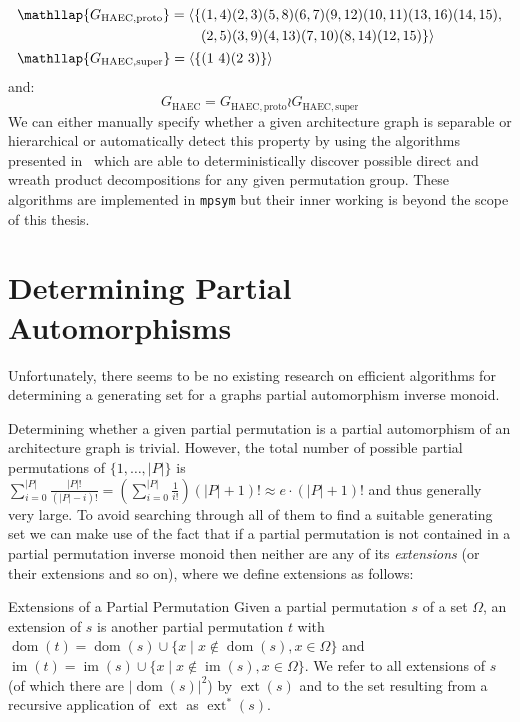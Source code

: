 \begin{align*}
  &\begin{aligned}
    \mathllap{G_{\mathrm{HAEC,proto}}} =
      \langle\{&(1, 4)(2, 3)(5, 8)(6, 7)(9, 12)(10, 11)(13, 16)(14, 15), \\
               &(2, 5)(3, 9)(4, 13)(7, 10)(8, 14)(12, 15)\}\rangle
    \end{aligned} \\
  &\mathllap{G_{\mathrm{HAEC,super}}} = \left<\{(1\ 4)(2\ 3)\}\right> \\
\end{align*}
%
and:
%
\begin{equation*}
  G_{\mathrm{HAEC}} = G_{\mathrm{HAEC,proto}} \wr G_{\mathrm{HAEC,super}}
\end{equation*}
%
We can either manually specify whether a given architecture graph is separable
or hierarchical or automatically detect this property by using the algorithms
presented in~\cite{Donaldson} which are able to deterministically discover
possible direct and wreath product decompositions for any given permutation
group. These algorithms are implemented in \texttt{mpsym} but their inner
working is beyond the scope of this thesis.

\section{Determining Partial Automorphisms}
\label{sec:ag_determining_partial_automorphisms}

Unfortunately, there seems to be no existing research on efficient algorithms
for determining a generating set for a graphs partial automorphism inverse
monoid.

Determining whether a given partial permutation is a partial automorphism of an
architecture graph is trivial. However, the total number of possible partial
permutations of $\{1, \dots, |P|\}$ is $\sum_{i=0}^{|P|} \frac{|P|!}{(|P| -
i)!} = \left(\sum_{i=0}^{|P|} \frac{1}{i!}\right) (|P| + 1)! \approx e \cdot
(|P| + 1)!$ and thus generally very large. To avoid searching through all of
them to find a suitable generating set we can make use of the fact that if a
partial permutation is not contained in a partial permutation inverse monoid
then neither are any of its \textit{extensions} (or their extensions and so
on), where we define extensions as follows:

\begin{defn}{Extensions of a Partial Permutation}
  Given a partial permutation $s$ of a set $\Omega$, an extension of $s$ is
  another partial permutation $t$ with $\operatorname{dom}(t) =
  \operatorname{dom}(s) \cup \{x \mid x \notin \operatorname{dom}(s), x \in
  \Omega\}$ and $\operatorname{im}(t) = \operatorname{im}(s) \cup \{x \mid x
  \notin \operatorname{im}(s), x \in \Omega\}$. We refer to all extensions of $s$
  (of which there are $|\operatorname{dom}(s)|^2$) by $\operatorname{ext}(s)$ and
  to the set resulting from a recursive application of $\operatorname{ext}$ as
  $\operatorname{ext}^*(s)$.
\end{defn}

